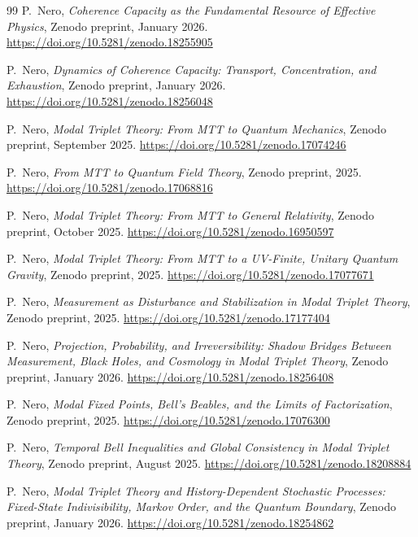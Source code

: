 \documentclass[11pt]{article}
\begin{document}
\begin{thebibliography}{99}
P.~Nero,
\emph{Coherence Capacity as the Fundamental Resource of Effective Physics},
Zenodo preprint, January 2026.
\url{https://doi.org/10.5281/zenodo.18255905}

P.~Nero,
\emph{Dynamics of Coherence Capacity: Transport, Concentration, and Exhaustion},
Zenodo preprint, January 2026.
\url{https://doi.org/10.5281/zenodo.18256048}

P.~Nero,
\emph{Modal Triplet Theory: From MTT to Quantum Mechanics},
Zenodo preprint, September 2025.
\url{https://doi.org/10.5281/zenodo.17074246}

P.~Nero,
\emph{From MTT to Quantum Field Theory},
Zenodo preprint, 2025.
\url{https://doi.org/10.5281/zenodo.17068816}

P.~Nero,
\emph{Modal Triplet Theory: From MTT to General Relativity},
Zenodo preprint, October 2025.
\url{https://doi.org/10.5281/zenodo.16950597}

P.~Nero,
\emph{Modal Triplet Theory: From MTT to a UV-Finite, Unitary Quantum Gravity},
Zenodo preprint, 2025.
\url{https://doi.org/10.5281/zenodo.17077671}

P.~Nero,
\emph{Measurement as Disturbance and Stabilization in Modal Triplet Theory},
Zenodo preprint, 2025.
\url{https://doi.org/10.5281/zenodo.17177404}

P.~Nero,
\emph{Projection, Probability, and Irreversibility: Shadow Bridges Between Measurement, Black Holes, and Cosmology in Modal Triplet Theory},
Zenodo preprint, January 2026.
\url{https://doi.org/10.5281/zenodo.18256408}

P.~Nero,
\emph{Modal Fixed Points, Bell's Beables, and the Limits of Factorization},
Zenodo preprint, 2025.
\url{https://doi.org/10.5281/zenodo.17076300}

P.~Nero,
\emph{Temporal Bell Inequalities and Global Consistency in Modal Triplet Theory},
Zenodo preprint, August 2025.
\url{https://doi.org/10.5281/zenodo.18208884}

P.~Nero,
\emph{Modal Triplet Theory and History-Dependent Stochastic Processes:
Fixed-State Indivisibility, Markov Order, and the Quantum Boundary},
Zenodo preprint, January 2026.
\url{https://doi.org/10.5281/zenodo.18254862}

\end{thebibliography}
\end{document}
